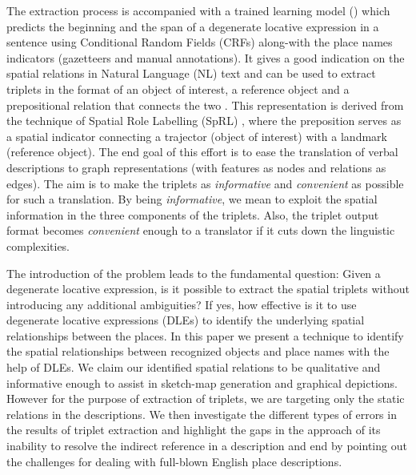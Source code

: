 \documentclass{acm_proc_article-sp}
\begin{document}
The extraction process is accompanied with a trained learning model (\cite{fei:locative}) which predicts the beginning and the span of a degenerate locative expression in a sentence using Conditional Random Fields (CRFs) along-with the place names indicators (gazetteers and manual annotations). It gives a good indication on the spatial relations in Natural Language (NL) text and can be used to extract triplets in the format of an object of interest, a reference object and a prepositional relation that connects the two . This representation is derived from the technique of Spatial Role Labelling (SpRL) \cite{Kordjamshidi:labelling}, where the preposition serves as a spatial indicator connecting a trajector (object of interest) with a landmark (reference object). The end goal of this effort is to ease the translation of verbal descriptions to graph representations (with features as nodes and relations as edges). The aim is to make the triplets as \textit{informative} and \textit{convenient} as possible for such a translation. By being \textit{informative}, we mean to exploit the spatial information in the three components of the triplets. Also, the triplet output format becomes \textit{convenient} enough to a translator if it cuts down the linguistic complexities.

The introduction of the problem leads to the fundamental question: Given a degenerate locative expression, is it possible to extract the spatial triplets without introducing any additional ambiguities? If yes, how effective is it to use degenerate locative expressions (DLEs) to identify the underlying spatial relationships between the places. In this paper we present a technique to identify the spatial relationships between recognized objects and place names with the help of DLEs. We claim our identified spatial relations to be qualitative and informative enough to assist in sketch-map generation and graphical depictions. However for the purpose of extraction of triplets, we are targeting only the static relations in the descriptions. We then investigate the different types of errors in the results of triplet extraction and highlight the gaps in the approach of its inability to resolve the indirect reference in a description and end by pointing out the challenges for dealing with full-blown English place descriptions.
\end{document}
